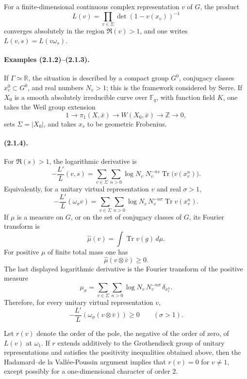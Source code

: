 \documentclass[11pt]{article}
\theoremstyle{remark}
\newcommand{\ZZ}{\mathbb{Z}}
\newcommand{\RR}{\mathbb{R}}
\newcommand{\Fq}{\mathbb{F}_q}
\begin{document}
For a finite-dimensional continuous complex representation \(v\) of \(G\), the product
\[
L(v)=\prod_{v\in\Sigma}\det(1-v(x_v))^{-1}
\]
converges absolutely in the region \(\Re(v)>1\), and one writes \(L(v,s)=L(v\omega_s)\).

\paragraph{Examples (2.1.2)--(2.1.3).}
If \(\Gamma\simeq\RR\), the situation is described by a compact group \(G^0\), conjugacy classes \(x_v^0\subset G^0\), and real numbers \(N_v>1\); this is the framework considered by Serre. If \(X_0\) is a smooth absolutely irreducible curve over \(\Fq\), with function field \(K\), one takes the Weil group extension
\[
1\longrightarrow \pi_1(X,\bar x)\longrightarrow W(X_0,\bar x)\longrightarrow \ZZ\longrightarrow 0,
\]
sets \(\Sigma=|X_0|\), and takes \(x_v\) to be geometric Frobenius.

\paragraph{(2.1.4).}
For \(\Re(s)>1\), the logarithmic derivative is
\[
-\frac{L'}{L}(v,s)
 =
 \sum_{v\in\Sigma}\sum_{n>0}
    \log N_v\; N_v^{-ns}\operatorname{Tr}\bigl(v(x_v^n)\bigr).
\]
Equivalently, for a unitary virtual representation \(v\) and real \(\sigma>1\),
\[
-\frac{L'}{L}(\omega_\sigma v)
 =
 \sum_{v\in\Sigma}\sum_{n>0}
    \log N_v\,N_v^{-n\sigma}\operatorname{Tr}v(x_v^n).
\]
If \(\mu\) is a measure on \(G\), or on the set of conjugacy classes of \(G\), its Fourier transform is
\[
\widehat\mu(v)=\int \operatorname{Tr}v(g)\,d\mu .
\]
For positive \(\mu\) of finite total mass one has
\[
\widehat\mu(v\otimes\bar v)\ge 0.
\]
The last displayed logarithmic derivative is the Fourier transform of the positive measure
\[
\mu_\sigma=\sum_{v\in\Sigma}\sum_{n>0}
     \log N_v\, N_v^{-n\sigma}\,\delta_{x_v^n}.
\]
Therefore, for every unitary virtual representation \(v\),
\[
-\frac{L'}{L}(\omega_\sigma(v\otimes\bar v))\ge 0
\qquad (\sigma>1).
\]

Let \(r(v)\) denote the order of the pole, the negative of the order of zero, of \(L(v)\) at \(\omega_1\). If \(r\) extends additively to the Grothendieck group of unitary representations and satisfies the positivity inequalities obtained above, then the Hadamard--de la Vallée-Poussin argument implies that \(r(v)=0\) for \(v\ne 1\), except possibly for a one-dimensional character of order \(2\).
\end{document}
